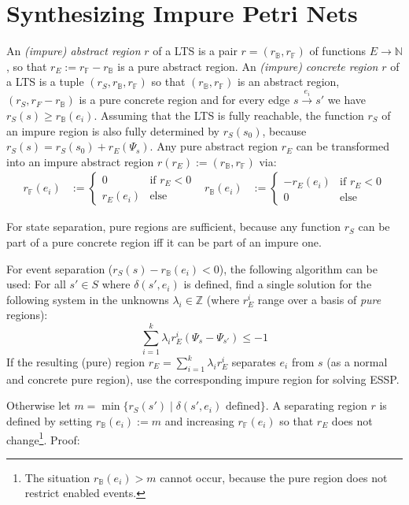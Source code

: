 \documentclass{scrartcl}
\newcommand{\N}{\mathbb{N}}
\newcommand{\Z}{\mathbb{Z}}
\newcommand{\B}{\mathbb{B}}
\newcommand{\F}{\mathbb{F}}
\newcommand{\1}{\textbf{1}}
\begin{document}
\section{Synthesizing Impure Petri Nets}
An \emph{(impure) abstract region} \(r\) of a LTS is a pair \(r=(r_\B, r_\F)\) of functions \(E\rightarrow\N\), so that
\(r_E:=r_\F-r_\B\) is a pure abstract region.
An \emph{(impure) concrete region} \(r\) of a LTS is a tuple \((r_S, r_\B, r_\F)\) so that \((r_\B, r_\F)\) is an abstract
region, \((r_S, r_F-r_\B)\) is a pure concrete region and for every edge \(s\xrightarrow{e_i}s'\) we have \(r_S(s)\geq
r_\B(e_i)\).
Assuming that the LTS is fully reachable, the function \(r_S\) of an impure region is also fully determined by
\(r_S(s_0)\), because \(r_S(s)=r_S(s_0)+r_E(\Psi_s)\).
Any pure abstract region \(r_E\) can be transformed into an impure abstract region \(r(r_E):=(r_\B, r_\F)\) via:
\begin{align*}
r_\F(e_i) &:= \begin{cases}
	0 & \text{if \(r_E<0\)} \\
	r_E(e_i) & \text{else}
\end{cases} &
r_\B(e_i) &:= \begin{cases}
	-r_E(e_i) & \text{if \(r_E<0\)} \\
	0 & \text{else}
\end{cases}
\end{align*}

For state separation, pure regions are sufficient, because any function \(r_S\) can be part of a pure concrete region iff it can
be part of an impure one.

For event separation (\(r_S(s)-r_\B(e_i)<0\)), the following algorithm can be used:
For all \(s'\in S\) where \(\delta(s',e_i)\) is defined, find a single solution for the following system in the unknowns
\(\lambda_i\in\Z\) (where \(r_E^i\) range over
a basis of \emph{pure} regions):
\[
\sum_{i=1}^k \lambda_i r_E^i(\Psi_s-\Psi_{s'}) \leq -1
\]
If the resulting (pure) region \(r_E=\sum_{i=1}^k\lambda_ir_E^i\) separates \(e_i\) from \(s\) (as a normal and concrete
pure region), use the corresponding impure region for solving ESSP.

Otherwise let \(m=\min\lbrace r_S(s')\mid \delta(s',e_i) \text{ defined}\rbrace\).  A separating region \(r\) is defined
by setting \(r_\B(e_i):=m\) and increasing \(r_\F(e_i)\) so that \(r_E\) does not change\footnote{The situation
\(r_\B(e_i)>m\) cannot occur, because the pure region does not restrict enabled events.}. Proof:
\end{document}
